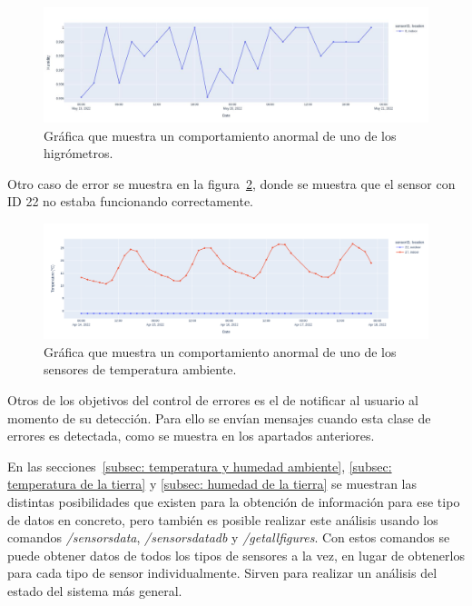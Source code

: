 \documentclass[a4paper, 12pt, oneside]{book}
\begin{document}
\begin{figure}[H]
	\centering
    \includegraphics[width=12cm, keepaspectratio]{img/problemas_sensor}
    \caption{Gráfica que muestra un comportamiento anormal de uno de los higrómetros.}
    \label{figura:sensor_problemas_higro}
\end{figure}

Otro caso de error se muestra en la figura~\ref{figura:error temperatura ambiente}, donde se muestra que el sensor con ID 22 no estaba funcionando correctamente.

\begin{figure}[H]
	\centering
    \includegraphics[width=12cm, keepaspectratio]{img/ambient_temperature_error}
    \caption{Gráfica que muestra un comportamiento anormal de uno de los sensores de temperatura ambiente.}
    \label{figura:error temperatura ambiente}
\end{figure}

Otros de los objetivos del control de errores es el de notificar al usuario al momento de su detección. Para ello se envían mensajes cuando esta clase de errores es detectada, como se muestra en los apartados anteriores.

En las secciones~\ref{subsec: temperatura y humedad ambiente}, \ref{subsec: temperatura de la tierra} y \ref{subsec: humedad de la tierra} se muestran las distintas posibilidades que existen para la obtención de información para ese tipo de datos en concreto, pero también es posible realizar este análisis usando los comandos \textit{/sensorsdata}, \textit{/sensorsdatadb} y \textit{/getallfigures}. Con estos comandos se puede obtener datos de todos los tipos de sensores a la vez, en lugar de obtenerlos para cada tipo de sensor individualmente. Sirven para realizar un análisis del estado del sistema más general.
\end{document}
